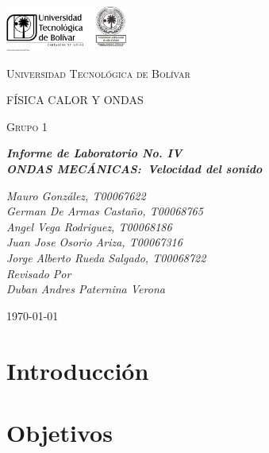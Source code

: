 \documentclass[twocolumn, 12pt]{article}
\begin{document}
\begin{titlepage}
    \centering
    \includegraphics[width=0.3\textwidth]{Images/logo_utb.png}\par\vspace{1cm}
    {\scshape\LARGE Universidad Tecnológica de Bolívar \par}
    \vspace{1cm}

    {\scshape\Large FÍSICA CALOR Y ONDAS \par}
    \vspace{.2cm}

    {\scshape\Large Grupo 1 \par}
    \vspace{1cm}
    \slshape {\Large \bfseries{}Informe de Laboratorio No. IV\\}
    \slshape {\small \bfseries{}ONDAS MECÁNICAS:~Velocidad del sonido}
    \vspace{2cm}

    \slshape {\itshape{} Mauro González, T00067622 \\}
    \slshape {\itshape{} German De Armas Castaño, T00068765 \\}
    \slshape {\itshape{} Angel Vega Rodriguez, T00068186 \\}
    \slshape {\itshape{} Juan Jose Osorio Ariza, T00067316 \\}
    \slshape {\itshape{} Jorge Alberto Rueda Salgado, T00068722 \\}
    \vfill
    Revisado Por \\
    Duban Andres Paternina Verona\\
    {\large \today\par}
\end{titlepage}


\section{Introducción}

\section{Objetivos}
\end{document}
